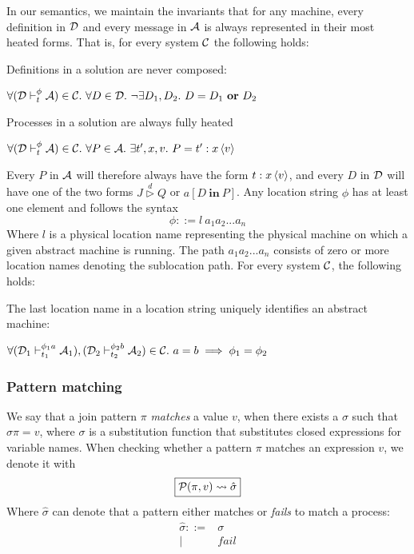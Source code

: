 In our semantics, we maintain the invariants that for any machine, every
definition in $\D$ and every message in $\A$ is always represented in their most
heated forms. That is, for every system $\C$ the following holds:
\begin{theorem}
Definitions in a solution are never composed:

$\forall (\D \vdash_t^\phi \A) \in \C.~ \forall D \in \D.~ \neg\exists D_1, D_2.~ D = D_1~\mathbf{or}~D_2$
\end{theorem}
\begin{theorem}
Processes in a solution are always fully heated

 $\forall (\D \vdash_t^\phi \A) \in \C.~ \forall P \in \A.~ \exists t',x,v.~ P =
 \atm t':x<v>$
\end{theorem}
Every $P$ in $\A$ will therefore
always have the form $\atm t : x<v>$, and every $D$ in $\D$ will have one of the
two forms $J \stackrel{d}{\triangleright} Q$ or $a[D ~\mathbf{in}~ P]$. Any
location string $\phi$ has at least one element and follows the syntax
\begin{equation*}
 \phi ::= l~a_1 a_2 ... a_n
\end{equation*}
Where $l$ is a physical location name representing the physical machine on
which a given abstract machine is running. The path $a_1a_2...a_n$ consists of
zero or more location names denoting the sublocation path. For every system
$\C$, the following holds:
\begin{theorem}
 \label{thm:unique-loc}
 The last location name in a location string uniquely identifies an abstract
 machine:

 $\forall (\D_1 \vdash_{t_1}^{\phi_1 a} \A_1), (\D_2 \vdash_{t_2}^{\phi_2 b}
 \A_2) \in \C.~ a = b \implies \phi_1 = \phi_2$
\end{theorem}


\subsubsection{Pattern matching}
We say that a join pattern $\pi$ \emph{matches} a value $v$, when there exists
a $\sigma$ such that $\sigma \pi = v$, where $\sigma$ is a substitution
function that substitutes closed expressions for variable names.
When checking whether a pattern $\pi$ matches an expression $v$, we denote it
with
\begin{equation*}
  \boxed{\P(\pi,v) \leadsto \hat\sigma}
\end{equation*}
Where $\hat\sigma$ can denote that a pattern either matches or \emph{fails} to
match a process:
\begin{align*}
 \hat\sigma ::={}& \sigma \\
         |\quad{}& fail
\end{align*}

